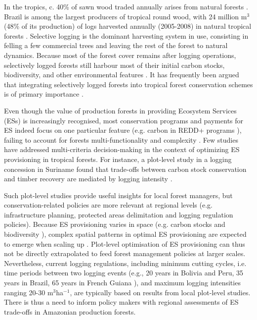 \documentclass{article}
\begin{document}
In the tropics, c. 40\% of sawn wood traded annually arises from natural forests \cite{Payn2015}. Brazil is among the largest producers of tropical round wood, with 24 million m$^3$ (48\% of its production) of logs harvested annually (2005-2008) in natural tropical forests \cite{Blaser2011}. Selective logging is the dominant harvesting system in use, consisting in felling a few commercial trees and leaving the rest of the forest to natural dynamics. 
Because most of the forest cover remains after logging operations, selectively logged forests still harbour most of their initial carbon stocks, biodiversity, and other environmental features \cite{Putz2012}. 
It has frequently been argued that integrating selectively logged forests into tropical forest conservation schemes is of primary importance \cite{Edwards2014a}. 

Even though the value of production forests in providing Ecosystem Services (ESs) is increasingly recognised, most conservation programs and payments for ES indeed focus on one particular feature (e.g. carbon in REDD+ programs \cite{Laing2016}), failing to account for forests multi-functionality and complexity \cite{VanderPlas2017}. 
Few studies have addressed multi-criteria decision-making in the context of optimizing ES provisioning in tropical forests. For instance, a plot-level study in a logging concession in Suriname found that trade-offs between carbon stock conservation and timber recovery are mediated by logging intensity \cite{Roopsind2018}. 

Such plot-level studies provide useful insights for local forest managers, but conservation-related policies are more relevant at regional levels \cite{Hein2006b} (e.g. infrastructure planning, protected areas delimitation and logging regulation policies). Because ES provisioning varies in space (e.g. carbon stocks \cite{Avitabile2016} and biodiversity \cite{Jenkins2013}), complex spatial patterns in optimal ES provisioning are expected to emerge when scaling up \cite{Gibson2000}. Plot-level optimisation of ES provisioning can thus not be directly extrapolated to feed forest management policies at larger scales. Nevertheless, current logging regulations, including minimum cutting cycles, i.e. time periods between two logging events (e.g., 20 years in Bolivia and Peru, 35 years in Brazil, 65 years in French Guiana \cite{Blaser2011}), and maximum logging intensities ranging 20-30 m$^3$ha$^{-1}$, are typically based on results from local plot-level studies. There is thus a need to inform policy makers with regional assessments of ES trade-offs in Amazonian production forests. 
\end{document}
